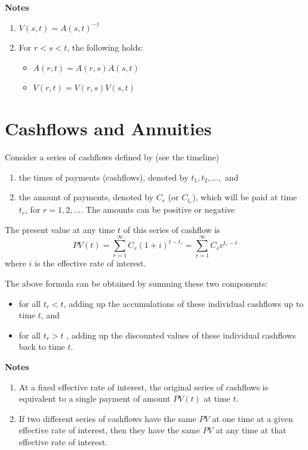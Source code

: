 \documentclass[landscape, 20pt]{extreport}
\theoremstyle{definition}
\theoremstyle{definition}
\theoremstyle{definition}
\theoremstyle{definition}
\theoremstyle{remark}
\begin{document}
\textbf{Notes}

\begin{enumerate}
\def\labelenumi{\arabic{enumi}.}
\item
  \(V(s,t) = A(s,t)^{-1}\)
\item
  For \(r < s < t\), the following holds:

  \begin{itemize}
  \item
    \(A(r,t) = A(r,s) A(s,t)\)
  \item
    \(V(r,t) = V(r,s) V(s,t)\)
  \end{itemize}
\end{enumerate}

\hypertarget{cashflows-and-annuities}{%
\section{Cashflows and Annuities}\label{cashflows-and-annuities}}

Consider a series of cashflows defined by (see the timeline)

\begin{enumerate}
\def\labelenumi{\arabic{enumi}.}
\item
  the times of payments (cashflows), denoted by \(t_1, t_2, \ldots,\)
  and
\item
  the amount of payments, denoted by \(C_{r}\) (or \(C_{t_r}\)), which
  will be paid at time \(t_r\), for \(r = 1,2, \ldots\). The amounts can
  be positive or negative
\end{enumerate}

The present value at any time \(t\) of this series of cashflow is
\[PV(t) = \sum_{r=1}^\infty C_r (1 + i)^{t - t_r} = \sum_{r=1}^\infty C_r v^{t _r - t}\]
where \(i\) is the effective rate of interest.

The above formula can be obtained by summing these two components:

\begin{itemize}
\item
  for all \(t_r < t\), adding up the accumulations of these individual
  cashflows up to time \(t\), and
\item
  for all \(t_r > t\) , adding up the discounted values of these
  individual cashflows back to time \(t\).
\end{itemize}

\textbf{Notes}

\begin{enumerate}
\def\labelenumi{\arabic{enumi}.}
\item
  At a fixed effective rate of interest, the original series of
  cashflows is equivalent to a single payment of amount \(PV(t)\) at
  time \(t\).
\item
  If two different series of cashflows have the same \(PV\) at one time
  at a given effective rate of interest, then they have the same \(PV\)
  at any time at that effective rate of interest.
\end{enumerate}
\end{document}
